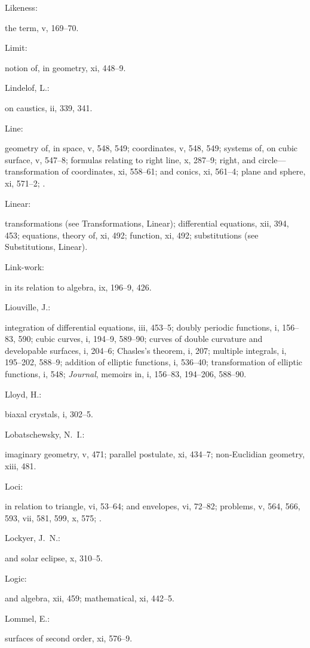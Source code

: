 \documentclass[11pt,a4paper]{book}
\providecommand{\V}[1]{#1}
\providecommand{\IndexEntry}[2]{#1\dotfill #2\par}
\begin{document}
\IndexEntry{Likeness}: the term, \V{v}, 169--70.

\IndexEntry{Limit}: notion of, in geometry, \V{xi}, 448--9.

\IndexEntry{Lindelof, L.}: on caustics, \V{ii}, 339, 341.

\IndexEntry{Line}: geometry of, in space, \V{v}, 548, 549; coordinates, \V{v}, 548, 549; systems of, on cubic surface, \V{v}, 547--8; formulas relating to right line, \V{x}, 287--9; right, and circle---transformation of coordinates, \V{xi}, 558--61; and conics, \V{xi}, 561--4; plane and sphere, \V{xi}, 571--2; .

\IndexEntry{Linear}: transformations (see Transformations, Linear); differential equations, \V{xii}, 394, 453; equations, theory of, \V{xi}, 492; function, \V{xi}, 492; substitutions (see Substitutions, Linear).

\IndexEntry{Link-work}: in its relation to algebra, \V{ix}, 196--9, 426.

\newpage

\setcounter{page}{110}

\IndexEntry{Liouville, J.}: integration of differential equations, \V{iii}, 453--5; doubly periodic functions, \V{i}, 156--83, 590; cubic curves, \V{i}, 194--9, 589--90; curves of double curvature and developable surfaces, \V{i}, 204--6; Chasles's theorem, \V{i}, 207; multiple integrals, \V{i}, 195--202, 588--9; addition of elliptic functions, \V{i}, 536--40; transformation of elliptic functions, \V{i}, 548; \textit{Journal}, memoirs in, \V{i}, 156--83, 194--206, 588--90.

\IndexEntry{Lloyd, H.}: biaxal crystals, \V{i}, 302--5.

\IndexEntry{Lobatschewsky, N.\ I.}: imaginary geometry, \V{v}, 471; parallel postulate, \V{xi}, 434--7; non-Euclidian geometry, \V{xiii}, 481.

\IndexEntry{Loci}: in relation to triangle, \V{vi}, 53--64; and envelopes, \V{vi}, 72--82; problems, \V{v}, 564, 566, 593, \V{vii}, 581, 599, \V{x}, 575; .

\IndexEntry{Lockyer, J.\ N.}: and solar eclipse, \V{x}, 310--5.

\IndexEntry{Logic}: and algebra, \V{xii}, 459; mathematical, \V{xi}, 442--5.

\IndexEntry{Lommel, E.}: surfaces of second order, \V{xi}, 576--9.
\end{document}
